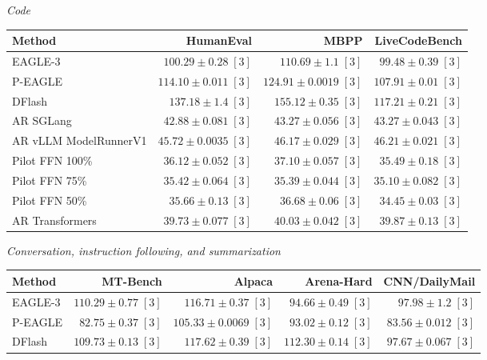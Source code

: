 \documentclass[conference,onecolumn]{IEEEtran}
\begin{document}
\begin{table}[!tp]
\par\medskip
\textit{Code}\par\smallskip
\begin{tabular}{@{}>{\raggedright\arraybackslash}p{3.7cm}rrr@{}}
\toprule
Method & HumanEval & MBPP & LiveCodeBench \\
\midrule
EAGLE-3 & \(100.29 \pm 0.28\;[3]\) & \(110.69 \pm 1.1\;[3]\) & \(99.48 \pm 0.39\;[3]\) \\
P-EAGLE & \(114.10 \pm 0.011\;[3]\) & \(124.91 \pm 0.0019\;[3]\) & \(107.91 \pm 0.01\;[3]\) \\
DFlash & \(\mathbf{137.18} \pm 1.4\;[3]\) & \(\mathbf{155.12} \pm 0.35\;[3]\) & \(\mathbf{117.21} \pm 0.21\;[3]\) \\
AR \textperiodcentered{} SGLang & \(42.88 \pm 0.081\;[3]\) & \(43.27 \pm 0.056\;[3]\) & \(43.27 \pm 0.043\;[3]\) \\
AR \textperiodcentered{} vLLM ModelRunnerV1 & \(45.72 \pm 0.0035\;[3]\) & \(46.17 \pm 0.029\;[3]\) & \(46.21 \pm 0.021\;[3]\) \\
Pilot FFN 100\% & \(36.12 \pm 0.052\;[3]\) & \(37.10 \pm 0.057\;[3]\) & \(35.49 \pm 0.18\;[3]\) \\
Pilot FFN 75\% & \(35.42 \pm 0.064\;[3]\) & \(35.39 \pm 0.044\;[3]\) & \(35.10 \pm 0.082\;[3]\) \\
Pilot FFN 50\% & \(35.66 \pm 0.13\;[3]\) & \(36.68 \pm 0.06\;[3]\) & \(34.45 \pm 0.03\;[3]\) \\
AR \textperiodcentered{} Transformers & \(39.73 \pm 0.077\;[3]\) & \(40.03 \pm 0.042\;[3]\) & \(39.87 \pm 0.13\;[3]\) \\
\bottomrule
\end{tabular}
\par\medskip
\textit{Conversation, instruction following, and summarization}\par\smallskip
\begin{tabular}{@{}>{\raggedright\arraybackslash}p{3.7cm}rrrr@{}}
\toprule
Method & MT-Bench & Alpaca & Arena-Hard & CNN/DailyMail \\
\midrule
EAGLE-3 & \(\mathbf{110.29} \pm 0.77\;[3]\) & \(116.71 \pm 0.37\;[3]\) & \(94.66 \pm 0.49\;[3]\) & \(\mathbf{97.98} \pm 1.2\;[3]\) \\
P-EAGLE & \(82.75 \pm 0.37\;[3]\) & \(105.33 \pm 0.0069\;[3]\) & \(93.02 \pm 0.12\;[3]\) & \(83.56 \pm 0.012\;[3]\) \\
DFlash & \(109.73 \pm 0.13\;[3]\) & \(\mathbf{117.62} \pm 0.39\;[3]\) & \(\mathbf{112.30} \pm 0.14\;[3]\) & \(97.67 \pm 0.067\;[3]\) \\

\end{tabular}
\end{table}
\end{document}
